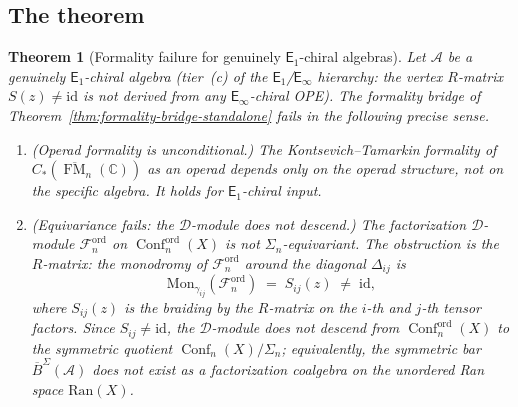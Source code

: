 \documentclass[11pt,reqno]{amsart}
\newtheorem{theorem}{Theorem}[section]
\theoremstyle{definition}
\theoremstyle{remark}
\newcommand{\cA}{\mathcal{A}}
\newcommand{\cD}{\mathcal{D}}
\newcommand{\cF}{\mathcal{F}}
\newcommand{\Ran}{\mathrm{Ran}}
\newcommand{\Eone}{\mathsf{E}_{1}}
\newcommand{\Einf}{\mathsf{E}_{\infty}}
\DeclareMathOperator{\Conf}{Conf}
\DeclareMathOperator{\FM}{FM}
\newcommand{\BarSig}{\overline{B}^{\Sigma}}
\newcommand{\CC}{\mathbb{C}}
\newcommand{\id}{\mathrm{id}}
\numberwithin{equation}{section}
\begin{document}
\subsection{The theorem}

\begin{theorem}[Formality failure for genuinely $\Eone$-chiral
algebras]
\label{thm:formality-failure-standalone}
Let $\cA$ be a genuinely $\Eone$-chiral algebra
(tier~(c) of the $\Eone$/$\Einf$ hierarchy: the vertex
$R$-matrix $S(z) \neq \id$ is not derived from any $\Einf$-chiral
OPE). The formality bridge of
Theorem~\textup{\ref{thm:formality-bridge-standalone}} fails in
the following precise sense.
\begin{enumerate}[label=\textup{(\roman*)}]
\item \textup{(Operad formality is unconditional.)}
  The Kontsevich--Tamarkin formality of
  $C_*(\overline{\FM}_n(\CC))$ as an operad depends only on
  the operad structure, not on the specific algebra. It holds
  for $\Eone$-chiral input.

\item \textup{(Equivariance fails: the $\cD$-module does not
  descend.)}
  The factorization $\cD$-module
  $\cF_n^{\mathrm{ord}}$ on $\Conf_n^{\mathrm{ord}}(X)$
  is \emph{not} $\Sigma_n$-equivariant. The obstruction is the
  $R$-matrix: the monodromy of $\cF_n^{\mathrm{ord}}$ around
  the diagonal $\Delta_{ij}$ is
  \begin{equation}\label{eq:monodromy-obstruction}
    \mathrm{Mon}_{\gamma_{ij}}(\cF_n^{\mathrm{ord}})
    \;=\;
    S_{ij}(z)
    \;\neq\; \id,
  \end{equation}
  where $S_{ij}(z)$ is the braiding by the $R$-matrix on the
  $i$-th and $j$-th tensor factors. Since
  $S_{ij} \neq \id$, the $\cD$-module does not descend from
  $\Conf_n^{\mathrm{ord}}(X)$ to the symmetric quotient
  $\Conf_n(X)/\Sigma_n$; equivalently, the symmetric bar
  $\BarSig(\cA)$ does not exist as a factorization coalgebra on
  the unordered Ran space $\Ran(X)$.


\end{enumerate}
\end{theorem}
\end{document}
